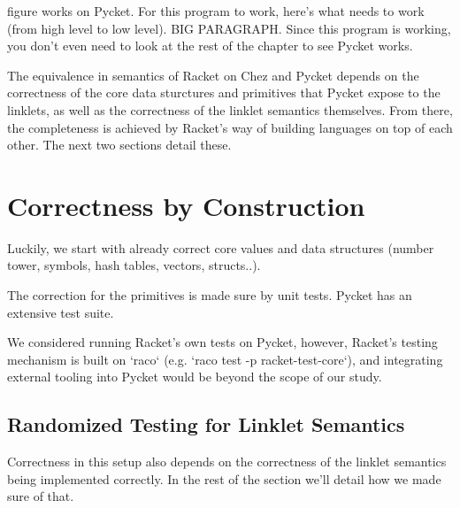 	\begin{paragraph-here}%
		figure  works on Pycket. For this program to work, here's what needs to work (from high level to low level). BIG PARAGRAPH. Since this program is working, you don't even need to look at the rest of the chapter to see Pycket works.
	\end{paragraph-here}

	\begin{paragraph-here}%
		The equivalence in semantics of Racket on Chez and Pycket depends on the correctness of the core data sturctures and primitives that Pycket expose to the linklets, as well as the correctness of the linklet semantics themselves. From there, the completeness is achieved by Racket's way of building languages on top of each other. The next two sections detail these.
	\end{paragraph-here}

	\section[\texorpdfstring{Correctness by Construction}{Correctness}]{Correctness by Construction}

		\begin{paragraph-here}%
			Luckily, we start with already correct core values and data structures (number tower, symbols, hash tables, vectors, structs..).
		\end{paragraph-here}


		\begin{paragraph-here}%
			The correction for the primitives is made sure by unit tests. Pycket has an extensive test suite. 
		\end{paragraph-here}

		\begin{paragraph-here}%
			We considered running Racket's own tests on Pycket, however, Racket's testing mechanism is built on `raco` (e.g. `raco test -p racket-test-core`), and integrating external tooling into Pycket would be beyond the scope of our study.
		\end{paragraph-here}

		\subsection{Randomized Testing for Linklet Semantics}
			\begin{paragraph-here}%
				Correctness in this setup also depends on the correctness of the linklet semantics being implemented correctly. In the rest of the section we'll detail how we made sure of that.
			\end{paragraph-here}

